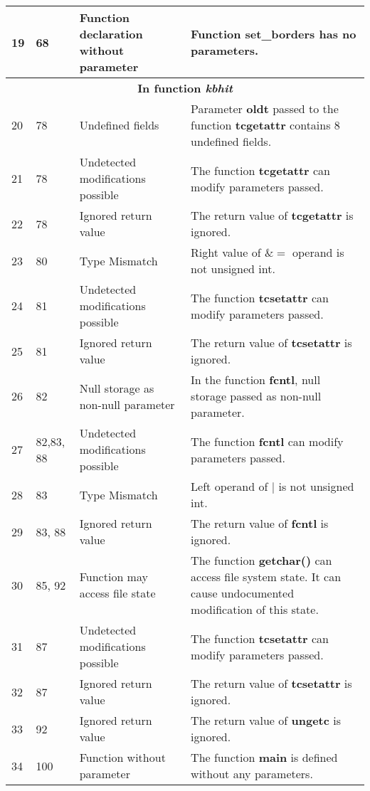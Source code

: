 \documentclass[]{article}
\begin{document}
\begin{longtable}{ |p{0.5cm}|p{0.75cm}|p{3cm}|p{9cm}|  }
 		\hline 
 		19 & 68 & Function declaration without parameter & Function \textbf{set\_borders} has no parameters. \\
 		\hline 
 		\multicolumn{4}{|c|}{\textbf{In function \textit{kbhit}}} \\
 		\hline 
 		20 & 78 & Undefined fields & Parameter \textbf{oldt} passed to the function \textbf{tcgetattr} contains 8 undefined fields. \\
 		\hline 
 		21 & 78 & Undetected modifications possible & The function \textbf{tcgetattr} can modify parameters passed. \\
 		\hline 
 		22 & 78 & Ignored return value & The return value of \textbf{tcgetattr} is ignored. \\
 		\hline 
 		23 & 80 & Type Mismatch & Right value of $\&=$ operand is not unsigned int. \\
 		\hline 
 		24 & 81 & Undetected modifications possible & The function \textbf{tcsetattr} can modify parameters passed. \\
 		\hline 
 		25 & 81 & Ignored return value & The return value of \textbf{tcsetattr} is ignored. \\
 		\hline 
 		26 & 82 & Null storage as non-null parameter & In the function \textbf{fcntl}, null storage passed as non-null parameter. \\
 		\hline 
 		27 & 82,83, 88 & Undetected modifications possible & The function \textbf{fcntl} can modify parameters passed. \\
 		\hline 
 		28 & 83 & Type Mismatch & Left operand of $|$ is not unsigned int. \\
 		\hline 
 		29 & 83, 88 & Ignored return value & The return value of \textbf{fcntl} is ignored. \\
 		\hline 
 		30 & 85, 92 & Function may access file state & The function \textbf{getchar()} can access file system state. It can cause undocumented modification of this state. \\
 		\hline 
 		31 & 87 & Undetected modifications possible & The function \textbf{tcsetattr} can modify parameters passed. \\
 		\hline 
 		32 & 87 & Ignored return value & The return value of \textbf{tcsetattr} is ignored. \\
 		\hline 
 		33 & 92 & Ignored return value & The return value of \textbf{ungetc} is ignored. \\
 		\hline 
 		34 & 100 & Function without parameter & The function \textbf{main} is defined without any parameters. \\

\end{longtable}
\end{document}
